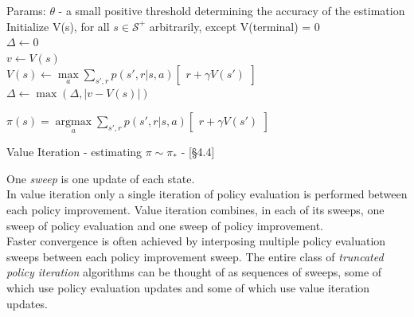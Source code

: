\documentclass[10pt,landscape]{article}
\DeclareMathOperator*{\argmax}{argmax}
\begin{document}
\begin{multicols}{3}
\begin{algorithm}[H]
Params: $\theta$ - a small positive threshold determining the accuracy of the estimation \\
Initialize V(s), for all $s \in \mathcal{S}^{+}$ arbitrarily, except V(terminal) = 0\\
 $\Delta \leftarrow 0$ \\
\While{$\Delta \ge \theta$}
{
   {
        $v \leftarrow V(s)$\\
        $V(s) \leftarrow \max\limits_a \sum\limits_{s', r} p(s',r | s, a) \begin{bmatrix}
                r + \gamma V(s')
        \end{bmatrix}$ \\
        $\Delta \leftarrow \max(\Delta, | v - V(s)|)$
        }
}

 $\pi(s) = \argmax\limits_a \sum\limits_{s', r} p(s',r | s, a) \begin{bmatrix}
     r + \gamma V(s')
  \end{bmatrix}$
\caption{Value Iteration - estimating  $\pi \sim \pi_*$ - [§4.4]}
\end{algorithm}
One \emph{sweep} is one update of each state.\\
In value iteration only a single iteration of policy evaluation is performed between each policy improvement. 
Value iteration combines, in each of its sweeps, one sweep of policy evaluation and one sweep of policy improvement.\\ Faster convergence is often achieved by interposing multiple policy evaluation sweeps between each policy improvement sweep.
The entire class of \emph{truncated policy iteration} algorithms can be thought of as sequences of sweeps, some of which use policy evaluation updates and some of which use value iteration updates.


\end{multicols}
\end{document}
